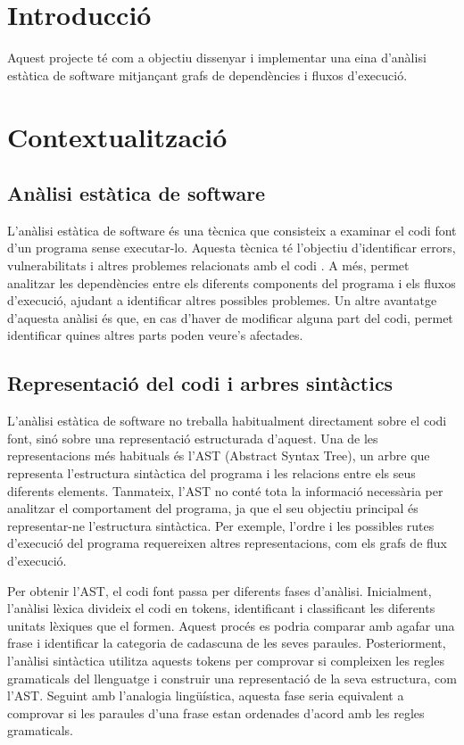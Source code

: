 \section*{Introducció}

Aquest projecte té com a objectiu dissenyar i implementar una eina d'anàlisi estàtica de software mitjançant grafs de dependències i fluxos d'execució.

\section*{Contextualització}
\subsection*{Anàlisi estàtica de software}
L'anàlisi estàtica de software és una tècnica que consisteix a examinar el codi font d'un programa sense executar-lo. Aquesta tècnica té l'objectiu d'identificar errors, vulnerabilitats i altres problemes relacionats amb el codi \cite{static_code_analysis_jetbrains}. A més, permet analitzar les dependències entre els diferents components del programa i els fluxos d'execució, ajudant a identificar altres possibles problemes. Un altre avantatge d'aquesta anàlisi és que, en cas d'haver de modificar alguna part del codi, permet identificar quines altres parts poden veure's afectades.


\subsection*{Representació del codi i arbres sintàctics}
L'anàlisi estàtica de software no treballa habitualment directament sobre el codi font, sinó sobre una representació estructurada d'aquest. Una de les representacions més habituals és l'AST (Abstract Syntax Tree), un arbre que representa l'estructura sintàctica del programa i les relacions entre els seus diferents elements. Tanmateix, l'AST no conté tota la informació necessària per analitzar el comportament del programa, ja que el seu objectiu principal és representar-ne l'estructura sintàctica. Per exemple, l'ordre i les possibles rutes d'execució del programa requereixen altres representacions, com els grafs de flux d'execució.

Per obtenir l'AST, el codi font passa per diferents fases d'anàlisi. Inicialment, l'anàlisi lèxica divideix el codi en tokens, identificant i classificant les diferents unitats lèxiques que el formen. Aquest procés es podria comparar amb agafar una frase i identificar la categoria de cadascuna de les seves paraules. Posteriorment, l'anàlisi sintàctica utilitza aquests tokens per comprovar si compleixen les regles gramaticals del llenguatge i construir una representació de la seva estructura, com l'AST. Seguint amb l'analogia lingüística, aquesta fase seria equivalent a comprovar si les paraules d'una frase estan ordenades d'acord amb les regles gramaticals.

